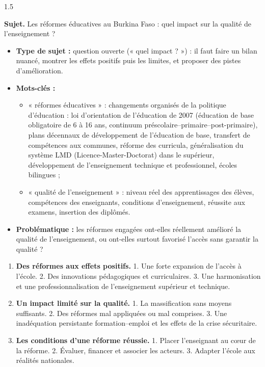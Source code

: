 \documentclass[12pt]{article}
\begin{document}
\begin{spacing}{1.5}

\noindent\textbf{Sujet.} Les réformes éducatives au Burkina Faso : quel impact sur la qualité de l'enseignement ?


\begin{itemize}
\item \textbf{Type de sujet :} question ouverte (« quel impact ? ») : il faut faire un bilan nuancé, montrer les effets positifs puis les limites, et proposer des pistes d'amélioration.
\item \textbf{Mots-clés :}
  \begin{itemize}
  \item « réformes éducatives » : changements organisés de la politique d'éducation : loi d'orientation de l'éducation de 2007 (éducation de base obligatoire de 6 à 16 ans, continuum préscolaire–primaire–post-primaire), plans décennaux de développement de l'éducation de base, transfert de compétences aux communes, réforme des curricula, généralisation du système LMD (Licence-Master-Doctorat) dans le supérieur, développement de l'enseignement technique et professionnel, écoles bilingues ;
  \item « qualité de l'enseignement » : niveau réel des apprentissages des élèves, compétences des enseignants, conditions d'enseignement, réussite aux examens, insertion des diplômés.
  \end{itemize}
\item \textbf{Problématique :} les réformes engagées ont-elles réellement amélioré la qualité de l'enseignement, ou ont-elles surtout favorisé l'accès sans garantir la qualité ?
\end{itemize}


\begin{enumerate}
\item[I.] \textbf{Des réformes aux effets positifs.} 1. Une forte expansion de l'accès à l'école. 2. Des innovations pédagogiques et curriculaires. 3. Une harmonisation et une professionnalisation de l'enseignement supérieur et technique.
\item[II.] \textbf{Un impact limité sur la qualité.} 1. La massification sans moyens suffisants. 2. Des réformes mal appliquées ou mal comprises. 3. Une inadéquation persistante formation–emploi et les effets de la crise sécuritaire.
\item[III.] \textbf{Les conditions d'une réforme réussie.} 1. Placer l'enseignant au cœur de la réforme. 2. Évaluer, financer et associer les acteurs. 3. Adapter l'école aux réalités nationales.
\end{enumerate}


\end{spacing}
\end{document}
